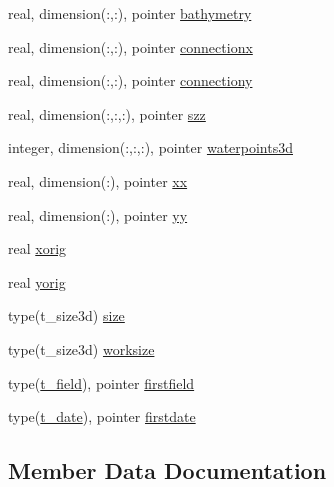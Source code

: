 \begin{DoxyCompactItemize}
real, dimension(\+:,\+:), pointer \mbox{\hyperlink{structmodulecfpolcomformat_1_1t__cfpolcomformat_abd11b89bdf060af6e01ec561825700b5}{bathymetry}}
\item 
real, dimension(\+:,\+:), pointer \mbox{\hyperlink{structmodulecfpolcomformat_1_1t__cfpolcomformat_a30499b1937b3da9348b1106b4e4c06e1}{connectionx}}
\item 
real, dimension(\+:,\+:), pointer \mbox{\hyperlink{structmodulecfpolcomformat_1_1t__cfpolcomformat_aec3ab0f8b5d1c43d7dedbc265fd09c34}{connectiony}}
\item 
real, dimension(\+:,\+:,\+:), pointer \mbox{\hyperlink{structmodulecfpolcomformat_1_1t__cfpolcomformat_ad046f6deca16c79236e29500f47d578a}{szz}}
\item 
integer, dimension(\+:,\+:,\+:), pointer \mbox{\hyperlink{structmodulecfpolcomformat_1_1t__cfpolcomformat_a1cff7a29a7aaaeb0b69b6312eb6a72d4}{waterpoints3d}}
\item 
real, dimension(\+:), pointer \mbox{\hyperlink{structmodulecfpolcomformat_1_1t__cfpolcomformat_a16a09fd7392937399e0a323860eb24eb}{xx}}
\item 
real, dimension(\+:), pointer \mbox{\hyperlink{structmodulecfpolcomformat_1_1t__cfpolcomformat_aefdb535f039ae7f419f02f64057c6406}{yy}}
\item 
real \mbox{\hyperlink{structmodulecfpolcomformat_1_1t__cfpolcomformat_ae4cbf4926c15bdee2e6bb547b924e93e}{xorig}}
\item 
real \mbox{\hyperlink{structmodulecfpolcomformat_1_1t__cfpolcomformat_a6c11dfc414b148c75ed3f60e4d6109ab}{yorig}}
\item 
type(t\+\_\+size3d) \mbox{\hyperlink{structmodulecfpolcomformat_1_1t__cfpolcomformat_a6aef0a83893cf8a5b856f85bd436c021}{size}}
\item 
type(t\+\_\+size3d) \mbox{\hyperlink{structmodulecfpolcomformat_1_1t__cfpolcomformat_a4b405f2e6cc58de3fc36826e12fa3272}{worksize}}
\item 
type(\mbox{\hyperlink{structmodulecfpolcomformat_1_1t__field}{t\+\_\+field}}), pointer \mbox{\hyperlink{structmodulecfpolcomformat_1_1t__cfpolcomformat_ae66fa2be74283a107e68d5bf79a4f61c}{firstfield}}
\item 
type(\mbox{\hyperlink{structmodulecfpolcomformat_1_1t__date}{t\+\_\+date}}), pointer \mbox{\hyperlink{structmodulecfpolcomformat_1_1t__cfpolcomformat_a120fd2b84fe09815dde925cff5628ea4}{firstdate}}
\end{DoxyCompactItemize}


\subsection{Member Data Documentation}
\mbox{\label{structmodulecfpolcomformat_1_1t__cfpolcomformat_abd11b89bdf060af6e01ec561825700b5}} 

